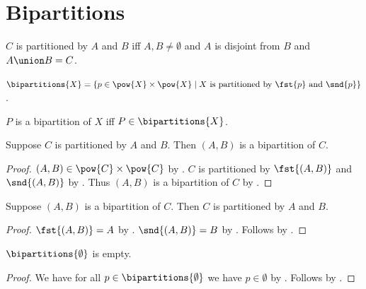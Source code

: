 





\section{Bipartitions}

\begin{abbreviation}\label{bipartitions}
    $C$ is partitioned by $A$ and $B$ iff $A,B\neq\emptyset$ and $A$ is disjoint from $B$ and $A\union B = C$.
\end{abbreviation}

\begin{definition}\label{bipartitions_of_a_set}
    $\bipartitions{X} = \{ p\in\pow{X}\times\pow{X}\mid \text{$X$ is partitioned by $\fst{p}$ and $\snd{p}$}\}$.
\end{definition}

\begin{abbreviation}\label{is_a_bipartition_of}
    $P$ is a bipartition of $X$ iff $P\in\bipartitions{X}$.
\end{abbreviation}

\begin{proposition}\label{bipartition_intro}
    Suppose $C$ is partitioned by $A$ and $B$.
    Then $(A, B)$ is a bipartition of $C$.
\end{proposition}
\begin{proof}
    $(A,B)\in\pow{C}\times\pow{C}$ by
        .
    $C$ is partitioned by $\fst{(A,B)}$ and $\snd{(A,B)}$
        by .
    Thus $(A, B)$ is a bipartition of $C$ by .
\end{proof}

\begin{proposition}\label{bipartition_elim}
    Suppose $(A, B)$ is a bipartition of $C$.
    Then $C$ is partitioned by $A$ and $B$.
\end{proposition}
\begin{proof}
    $\fst{(A, B)} = A$ by .
    $\snd{(A, B)} = B$ by .
    Follows by .
\end{proof}

\begin{proposition}\label{bipartitions_emptyset}
    $\bipartitions{\emptyset}$ is empty.
\end{proposition}
\begin{proof}
    We have for all $p\in\bipartitions{\emptyset}$
        we have $p\in\emptyset$
        by .
    Follows by .
\end{proof}

